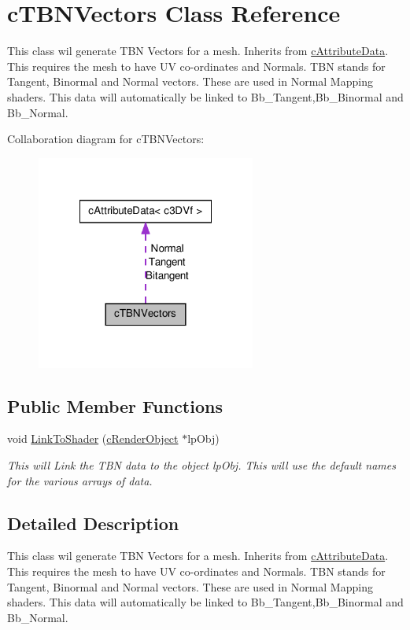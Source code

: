 \hypertarget{classc_t_b_n_vectors}{
\section{cTBNVectors Class Reference}
\label{classc_t_b_n_vectors}
}


This class wil generate TBN Vectors for a mesh. Inherits from \hyperlink{classc_attribute_data}{cAttributeData}. This requires the mesh to have UV co-\/ordinates and Normals. TBN stands for Tangent, Binormal and Normal vectors. These are used in Normal Mapping shaders. This data will automatically be linked to Bb\_\-Tangent,Bb\_\-Binormal and Bb\_\-Normal.  




Collaboration diagram for cTBNVectors:\nopagebreak
\begin{figure}[H]
\begin{center}
\leavevmode
\includegraphics[width=204pt]{classc_t_b_n_vectors__coll__graph}
\end{center}
\end{figure}
\subsection*{Public Member Functions}
\begin{DoxyCompactItemize}
\item 
\hypertarget{classc_t_b_n_vectors_a34947948cef67e08dc5e10e268370df5}{
void \hyperlink{classc_t_b_n_vectors_a34947948cef67e08dc5e10e268370df5}{LinkToShader} (\hyperlink{classc_render_object}{cRenderObject} $\ast$lpObj)}
\label{classc_t_b_n_vectors_a34947948cef67e08dc5e10e268370df5}

\begin{DoxyCompactList}\small\item\em This will Link the TBN data to the object lpObj. This will use the default names for the various arrays of data. \end{DoxyCompactList}\end{DoxyCompactItemize}


\subsection{Detailed Description}
This class wil generate TBN Vectors for a mesh. Inherits from \hyperlink{classc_attribute_data}{cAttributeData}. This requires the mesh to have UV co-\/ordinates and Normals. TBN stands for Tangent, Binormal and Normal vectors. These are used in Normal Mapping shaders. This data will automatically be linked to Bb\_\-Tangent,Bb\_\-Binormal and Bb\_\-Normal. 